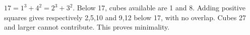 $\boxed{17}=1^3+4^2=2^3+3^2$. Below 17, cubes available are 1 and 8. Adding positive squares gives respectively 2,5,10 and 9,12 below 17, with no overlap. Cubes 27 and larger cannot contribute. This proves minimality.
